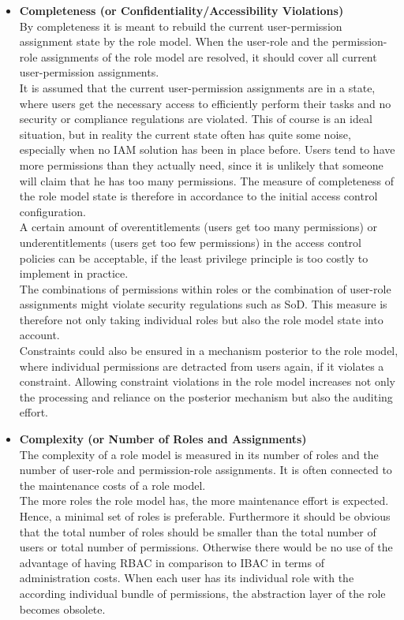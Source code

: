     \begin{itemize}
        \item \textbf{Completeness (or Confidentiality/Accessibility Violations)}\\
        By completeness it is meant to rebuild the current user-permission assignment state by the role model. When the user-role and the permission-role assignments of the role model are resolved, it should cover all current user-permission assignments.\\
        It is assumed that the current user-permission assignments are in a state, where users get the necessary access to efficiently perform their tasks and no security or compliance regulations are violated. This of course is an ideal situation, but in reality the current state often has quite some noise, especially when no IAM solution has been in place before. Users tend to have more permissions than they actually need, since it is unlikely that someone will claim that he has too many permissions. The measure of completeness of the role model state is therefore in accordance to the initial access control configuration.\\
        A certain amount of overentitlements (users get too many permissions) or underentitlements (users get too few permissions) in the access control policies can be acceptable, if the least privilege principle is too costly to implement in practice.\\
        The combinations of permissions within roles or the combination of user-role assignments might violate security regulations such as SoD. This measure is therefore not only taking individual roles but also the role model state into account.\\
        Constraints could also be ensured in a mechanism posterior to the role model, where individual permissions are detracted from users again, if it violates a constraint. Allowing constraint violations in the role model increases not only the processing and reliance on the posterior mechanism but also the auditing effort.
        \item \textbf{Complexity (or Number of Roles and Assignments)}\\
        The complexity of a role model is measured in its number of roles and the number of user-role and permission-role assignments. It is often connected to the maintenance costs of a role model.\\
        The more roles the role model has, the more maintenance effort is expected. Hence, a minimal set of roles is preferable. Furthermore it should be obvious that the total number of roles should be smaller than the total number of users or total number of permissions. Otherwise there would be no use of the advantage of having RBAC in comparison to IBAC in terms of administration costs. When each user has its individual role with the according individual bundle of permissions, the abstraction layer of the role becomes obsolete.\\

\end{itemize}

